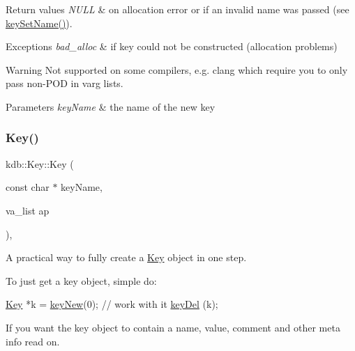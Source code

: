 \begin{DoxyRetVals}{Return values}
{\em N\+U\+LL} & on allocation error or if an invalid {\ttfamily name} was passed (see \hyperlink{group__keyname_ga7699091610e7f3f43d2949514a4b35d9}{key\+Set\+Name()}).\\
\hline
\end{DoxyRetVals}

\begin{DoxyExceptions}{Exceptions}
{\em bad\+\_\+alloc} & if key could not be constructed (allocation problems)\\
\hline
\end{DoxyExceptions}
\begin{DoxyWarning}{Warning}
Not supported on some compilers, e.\+g. clang which require you to only pass non-\/\+P\+OD in varg lists.
\end{DoxyWarning}

\begin{DoxyParams}{Parameters}
{\em key\+Name} & the name of the new key \\
\hline
\end{DoxyParams}
\mbox{\label{classkdb_1_1Key_aa0dc94c7e676a0d280e5817e4c6238d3}} 
\subsubsection{\texorpdfstring{Key()}{Key()}\hspace{0.1cm}{\footnotesize\ttfamily [7/7]}}
{\footnotesize\ttfamily kdb\+::\+Key\+::\+Key (\begin{DoxyParamCaption}\item[{const char $\ast$}]{key\+Name,  }\item[{va\+\_\+list}]{ap }\end{DoxyParamCaption})\hspace{0.3cm}{\ttfamily [inline]}, {\ttfamily [explicit]}}



A practical way to fully create a \hyperlink{classkdb_1_1Key}{Key} object in one step. 

To just get a key object, simple do\+:


\begin{DoxyCodeInclude}
\hyperlink{classkdb_1_1Key_a5679f5cae63caddd64a60388b9cc77fa}{Key} *k = \hyperlink{group__key_gad23c65b44bf48d773759e1f9a4d43b89}{keyNew}(0);
\textcolor{comment}{// work with it}
\hyperlink{group__key_ga3df95bbc2494e3e6703ece5639be5bb1}{keyDel} (k);
\end{DoxyCodeInclude}
 If you want the key object to contain a name, value, comment and other meta info read on.

